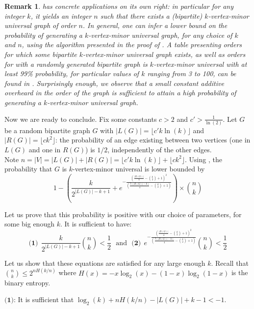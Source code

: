 \documentclass[10pt,a4paper]{article}
\newtheorem{remark}{Remark}[section]
\newcommand{\ls}{\leqslant}
\begin{document}
\begin{remark}
     has concrete applications on its own right: in particular for any integer $k$, it yields an integer $n$ such that there exists a (bipartite) $k$-vertex-minor universal graph of order $n$. In general, one can infer a lower bound on the probability of generating a $k$-vertex-minor universal graph, for any choice of $k$ and $n$, using the algorithm presented in the proof of . A table presenting orders for which some bipartite $k$-vertex-minor universal graph exists, as well as orders for with a randomly generated bipartite graph is $k$-vertex-minor universal with at least 99\% probability, for particular values of $k$ ranging from 3 to 100, can be found in . Surprisingly enough, we observe that a small constant additive overheard in the order of the graph is sufficient to attain a high probability of generating a $k$-vertex-minor universal graph.  
\end{remark}

Now we are ready to conclude. Fix some constants $c>2$ and $c'>\frac{1}{\ln(2)}$. Let $G$ be a random bipartite graph $G$ with $|L(G)| = \lfloor c'k\ln(k) \rfloor$ and $|R(G)| = \lfloor ck^2 \rfloor$: the probability of an edge existing between two vertices (one in $L(G)$ and one in $R(G)$) is $1/2$, independently of the other edges.\\

Note $n = |V| = |L(G)| + |R(G)| = \lfloor c'k\ln(k) \rfloor + \lfloor ck^2 \rfloor$. Using , the probability that $G$ is $k$-vertex-minor universal is lower bounded by $$  1 - \left( \frac{k}{2^{|L(G)|-k+1}} + e^{-\frac{\left(\frac{|R(G)|}{4}-{k \choose 2}+1\right)^2}{\left(\frac{7(|R(G)|-k)}{4}-{k \choose 2}+1\right)}}\right)\times {n \choose k} $$

Let us prove that this probability is positive with our choice of parameters, for some big enough $k$. It is sufficient to have: $$\textbf{(1)}~~  \frac{k}{2^{|L(G)|-k+1}}{n \choose k}< \dfrac{1}{2} \text{~~and~~} \textbf{(2)}~~ e^{-\frac{\left(\frac{|R(G)|}{4}-{k \choose 2}+1\right)^2}{\left(\frac{7(|R(G)|-k)}{4}-{k \choose 2}+1\right)}}{n \choose k}< \dfrac{1}{2} $$

Let us show that these equations are satisfied for any large enough $k$. Recall that ${n \choose k} \ls 2^{nH(k/n)}$ where $H(x) = -x\log_2(x)-(1-x)\log_2(1-x)$ is the binary entropy.

$\textbf{(1)}$: It is sufficient that $\log_2(k)+nH(k/n)-|L(G)|+k-1 < -1$. 
\end{document}
